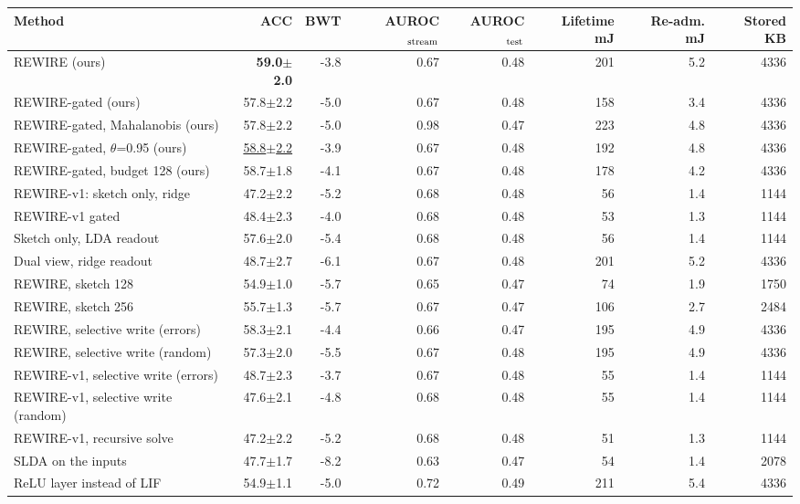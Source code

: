 \begin{tabular}{lrrrrrrr}
\toprule
Method & ACC & BWT & AUROC$_{\rm stream}$ & AUROC$_{\rm test}$ & Lifetime mJ & Re-adm. mJ & Stored KB \\
\midrule
REWIRE (ours) & \textbf{59.0{\tiny$\pm$2.0}} & -3.8 & 0.67 & 0.48 & 201 & 5.2 & 4336 \\
REWIRE-gated (ours) & 57.8{\tiny$\pm$2.2} & -5.0 & 0.67 & 0.48 & 158 & 3.4 & 4336 \\
REWIRE-gated, Mahalanobis (ours) & 57.8{\tiny$\pm$2.2} & -5.0 & 0.98 & 0.47 & 223 & 4.8 & 4336 \\
REWIRE-gated, $\theta$=0.95 (ours) & \underline{58.8{\tiny$\pm$2.2}} & -3.9 & 0.67 & 0.48 & 192 & 4.8 & 4336 \\
REWIRE-gated, budget 128 (ours) & 58.7{\tiny$\pm$1.8} & -4.1 & 0.67 & 0.48 & 178 & 4.2 & 4336 \\
REWIRE-v1: sketch only, ridge & 47.2{\tiny$\pm$2.2} & -5.2 & 0.68 & 0.48 & 56 & 1.4 & 1144 \\
REWIRE-v1 gated & 48.4{\tiny$\pm$2.3} & -4.0 & 0.68 & 0.48 & 53 & 1.3 & 1144 \\
Sketch only, LDA readout & 57.6{\tiny$\pm$2.0} & -5.4 & 0.68 & 0.48 & 56 & 1.4 & 1144 \\
Dual view, ridge readout & 48.7{\tiny$\pm$2.7} & -6.1 & 0.67 & 0.48 & 201 & 5.2 & 4336 \\
REWIRE, sketch 128 & 54.9{\tiny$\pm$1.0} & -5.7 & 0.65 & 0.47 & 74 & 1.9 & 1750 \\
REWIRE, sketch 256 & 55.7{\tiny$\pm$1.3} & -5.7 & 0.67 & 0.47 & 106 & 2.7 & 2484 \\
REWIRE, selective write (errors) & 58.3{\tiny$\pm$2.1} & -4.4 & 0.66 & 0.47 & 195 & 4.9 & 4336 \\
REWIRE, selective write (random) & 57.3{\tiny$\pm$2.0} & -5.5 & 0.67 & 0.48 & 195 & 4.9 & 4336 \\
REWIRE-v1, selective write (errors) & 48.7{\tiny$\pm$2.3} & -3.7 & 0.67 & 0.48 & 55 & 1.4 & 1144 \\
REWIRE-v1, selective write (random) & 47.6{\tiny$\pm$2.1} & -4.8 & 0.68 & 0.48 & 55 & 1.4 & 1144 \\
REWIRE-v1, recursive solve & 47.2{\tiny$\pm$2.2} & -5.2 & 0.68 & 0.48 & 51 & 1.3 & 1144 \\
SLDA on the inputs & 47.7{\tiny$\pm$1.7} & -8.2 & 0.63 & 0.47 & 54 & 1.4 & 2078 \\
ReLU layer instead of LIF & 54.9{\tiny$\pm$1.1} & -5.0 & 0.72 & 0.49 & 211 & 5.4 & 4336 \\

\end{tabular}
